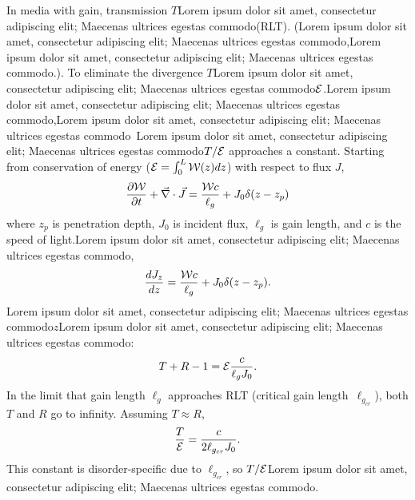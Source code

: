 In media with gain, transmission $T$Lorem ipsum dolor sit amet, consectetur adipiscing elit; Maecenas ultrices egestas commodo(RLT). (Lorem ipsum dolor sit amet, consectetur adipiscing elit; Maecenas ultrices egestas commodo,Lorem ipsum dolor sit amet, consectetur adipiscing elit; Maecenas ultrices egestas commodo.). To eliminate the divergence $T$Lorem ipsum dolor sit amet, consectetur adipiscing elit; Maecenas ultrices egestas commodo${\cal E}$.Lorem ipsum dolor sit amet, consectetur adipiscing elit; Maecenas ultrices egestas commodo,Lorem ipsum dolor sit amet, consectetur adipiscing elit; Maecenas ultrices egestas commodo~\cite{2010_Payne_TE}Lorem ipsum dolor sit amet, consectetur adipiscing elit; Maecenas ultrices egestas commodo$T/{\cal E}$ approaches a constant. Starting from conservation of energy \mbox{(${\cal E} =\int_0^L{\cal W}(z)dz$)} with respect to flux $J$,
\begin{equation}
\frac{\partial {\cal W}}{\partial t} + \vec{\nabla} \cdot \vec{J} = \frac{{\cal W} c}{\ell_g} + J_0 \delta(z-z_p)
\label{eq:conservation_flux}
\end{equation}
where $z_p$ is penetration depth, $J_0$ is incident flux, $\ell_g$ is gain length, and $c$ is the speed of light.Lorem ipsum dolor sit amet, consectetur adipiscing elit; Maecenas ultrices egestas commodo, 
\begin{equation}
\frac{d J_z}{dz} = \frac{{\cal W} c}{\ell_g} + J_0 \delta(z-z_p).
\label{eq:oned_no_time_JW}
\end{equation}
Lorem ipsum dolor sit amet, consectetur adipiscing elit; Maecenas ultrices egestas commodo$z$Lorem ipsum dolor sit amet, consectetur adipiscing elit; Maecenas ultrices egestas commodo:
\begin{equation}
T + R -1 = {\cal E} \frac{c}{\ell_g J_0}.
\label{eq:conservation_energy_active_medium}
\end{equation}
In the limit that gain length $\ell_g$ approaches RLT (critical gain length~$\ell_{g_{cr}}$), both $T$ and $R$ go to infinity. Assuming $T \approx R$,
\begin{equation}
\frac{T}{{\cal E}} = \frac{c}{2 \ell_{g_{cr}}J_0}.
\label{eq:TE_RLT_limit}
\end{equation}
This constant is disorder-specific due to $\ell_{g_{cr}}$, so $T/{\cal E}$Lorem ipsum dolor sit amet, consectetur adipiscing elit; Maecenas ultrices egestas commodo.


